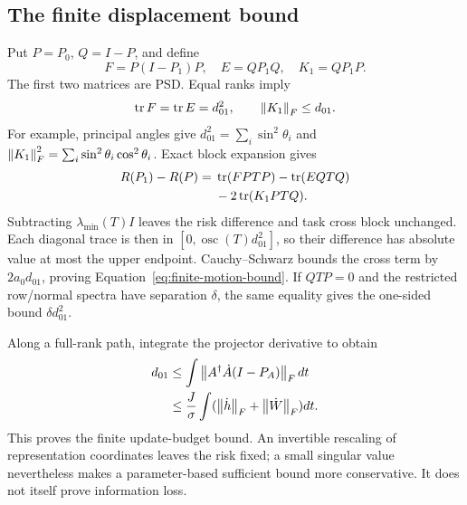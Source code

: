 \subsection{The finite displacement bound}
Put $P=P_0$, $Q=I-P$, and define
\begin{equation}
 F=P(I-P_1)P,\quad E=QP_1Q,\quad K_1=QP_1P.
\end{equation}
The first two matrices are PSD. Equal ranks imply
\begin{equation}
 \operatorname{tr} F=\operatorname{tr} E=d_{01}^2,\qquad \left\lVert K_1\right\rVert_F\le d_{01}.
\end{equation}
For example, principal angles give $d_{01}^2=\sum_i\sin^2\theta_i$ and $\left\lVert K_1\right\rVert_F^2=\sum_i\sin^2\theta_i\cos^2\theta_i$. Exact block expansion gives
\begin{align}
 R(P_1)-R(P)={}&\operatorname{tr}(FPTP)-\operatorname{tr}(EQTQ)\\
 &-2\operatorname{tr}(K_1PTQ).\nonumber
 \label{eq:exact-leakage}
\end{align}
Subtracting $\lambda_{\min}(T)I$ leaves the risk difference and task cross block unchanged. Each diagonal trace is then in $[0,\operatorname{osc}(T)d_{01}^2]$, so their difference has absolute value at most the upper endpoint. Cauchy--Schwarz bounds the cross term by $2a_0d_{01}$, proving Equation~\eqref{eq:finite-motion-bound}. If $QTP=0$ and the restricted row/normal spectra have separation $\delta$, the same equality gives the one-sided bound $\delta d_{01}^2$.

Along a full-rank path, integrate the projector derivative to obtain
\begin{align}
 d_{01}&\le\int\left\lVert A^\dagger\dot A(I-P_A)\right\rVert_Fdt\nonumber\\
 &\le\frac J\sigma\int(\left\lVert \dot h\right\rVert_F+\left\lVert \dot W\right\rVert_F)dt.
\end{align}
This proves the finite update-budget bound. An invertible rescaling of representation coordinates leaves the risk fixed; a small singular value nevertheless makes a parameter-based sufficient bound more conservative. It does not itself prove information loss.

